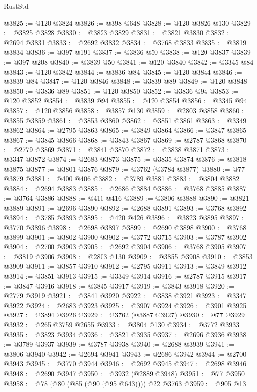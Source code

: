\begin{lexlean}{RustStd}
\begin{coremodule}
@3825 := @120 @3824
@3826 := @398 @648
@3828 := @120 @3826 @130
@3829 := @3825 @3828
@3830 := @3823 @3829
@3831 := @3821 @3830
@3832 := @2694 @3831
@3833 := @2692 @3832
@3834 := @3768 @3833
@3835 := @3819 @3834
@3836 := @397 @191
@3837 := @3836 @50
@3838 := @120 @3837
@3839 := @397 @208
@3840 := @3839 @50
@3841 := @120 @3840
@3842 := @3345 @84
@3843 := @120 @3842
@3844 := @3836 @84
@3845 := @120 @3844
@3846 := @3839 @84
@3847 := @120 @3846
@3848 := @3839 @89
@3849 := @120 @3848
@3850 := @3836 @89
@3851 := @120 @3850
@3852 := @3836 @94
@3853 := @120 @3852
@3854 := @3839 @94
@3855 := @120 @3854
@3856 := @3345 @94
@3857 := @120 @3856
@3858 := @3857 @130
@3859 := @2803 @3858
@3860 := @3855 @3859
@3861 := @3853 @3860
@3862 := @3851 @3861
@3863 := @3349 @3862
@3864 := @2795 @3863
@3865 := @3849 @3864
@3866 := @3847 @3865
@3867 := @3845 @3866
@3868 := @3843 @3867
@3869 := @2787 @3868
@3870 := @2779 @3869
@3871 := @3841 @3870
@3872 := @3838 @3871
@3873 := @3347 @3872
@3874 := @2683 @3873
@3875 := @3835 @3874
@3876 := @3818 @3875
@3877 := @3801 @3876
@3879 := @3762 (@3784 @3877)
@3880 := @77 @3879
@3881 := @400 @406
@3882 := @3789 @3881
@3883 := @3804 @3882
@3884 := @2694 @3883
@3885 := @2686 @3884
@3886 := @3768 @3885
@3887 := @3764 @3886
@3888 := @410 @416
@3889 := @3806 @3888
@3890 := @3821 @3889
@3891 := @2696 @3890
@3892 := @2688 @3891
@3893 := @3768 @3892
@3894 := @3785 @3893
@3895 := @420 @426
@3896 := @3823 @3895
@3897 := @3770 @3896
@3898 := @2698 @3897
@3899 := @2690 @3898
@3900 := @3768 @3899
@3901 := @3802 @3900
@3902 := @3772 @3715
@3903 := @3787 @3902
@3904 := @2700 @3903
@3905 := @2692 @3904
@3906 := @3768 @3905
@3907 := @3819 @3906
@3908 := @2803 @130
@3909 := @3855 @3908
@3910 := @3853 @3909
@3911 := @3857 @3910
@3912 := @2795 @3911
@3913 := @3849 @3912
@3914 := @3851 @3913
@3915 := @3349 @3914
@3916 := @2787 @3915
@3917 := @3847 @3916
@3918 := @3845 @3917
@3919 := @3843 @3918
@3920 := @2779 @3919
@3921 := @3841 @3920
@3922 := @3838 @3921
@3923 := @3347 @3922
@3924 := @2683 @3923
@3925 := @3907 @3924
@3926 := @3901 @3925
@3927 := @3894 @3926
@3929 := @3762 (@3887 @3927)
@3930 := @77 @3929
@3932 := @265 @3759 @2655
@3933 := @3804 @130
@3934 := @3772 @3933
@3935 := @3823 @3934
@3936 := @3821 @3935
@3937 := @2696 @3936
@3938 := @3789 @3937
@3939 := @3787 @3938
@3940 := @2688 @3939
@3941 := @3806 @3940
@3942 := @2694 @3941
@3943 := @2686 @3942
@3944 := @2700 @3943
@3945 := @3770 @3944
@3946 := @2692 @3945
@3947 := @2698 @3946
@3948 := @2690 @3947
@3950 := @3932 (@2889 @3948)
@3951 := @77 @3950
@3958 := @78 (@80 (@85 (@90 (@95 @643)))) @22 @3763
@3959 := @905 @13

\end{coremodule}
\end{lexlean}

